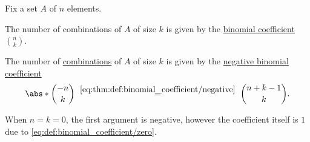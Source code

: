 \begin{proposition}\label{thm:combinatorial_combination_count}
  Fix a set \( A \) of \( n \) elements.

  \begin{thmenum}
     The number of combinations of \( A \) of size \( k \)  is given by the \hyperref[def:binomial_coefficient]{binomial coefficient} \( \binom n k \).

     The number of \hyperref[def:combinatorial_combination]{combinations} of \( A \) of size \( k \)  is given by the \hyperref[def:binomial_coefficient]{negative binomial coefficient}
    \begin{equation}\label{eq:thm:combinatorial_combination_count/repetition}
      \abs*{ \binom {-n} k }
      \reloset {\eqref{eq:thm:def:binomial_coefficient/negative}} =
      \binom {n + k - 1} k.
    \end{equation}

    When \( n = k = 0 \), the first argument is negative, however the coefficient itself is \( 1 \) due to \eqref{eq:def:binomial_coefficient/zero}.
  \end{thmenum}
\end{proposition}
